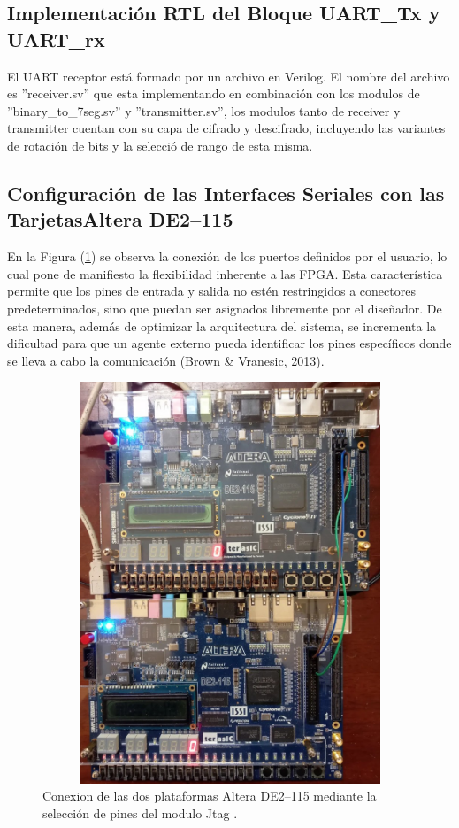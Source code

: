\subsection{Implementación RTL del Bloque UART\_Tx y UART\_rx }
El UART receptor está formado por un archivo en Verilog. El nombre del archivo es ''receiver.sv'' que esta implementando en combinación con los modulos de ''binary\_to\_7seg.sv'' y ''transmitter.sv'', los modulos tanto de receiver y transmitter cuentan con su capa de cifrado y descifrado, incluyendo las variantes de rotación de bits y la selecció de rango de esta misma.

\subsection{Configuración de las Interfaces Seriales con las TarjetasAltera DE2–115 }

En la Figura (\ref{fig:imagen13}) se observa la conexión de los puertos definidos por el usuario, lo cual pone de manifiesto la flexibilidad inherente a las FPGA. Esta característica permite que los pines de entrada y salida no estén restringidos a conectores predeterminados, sino que puedan ser asignados libremente por el diseñador. De esta manera, además de optimizar la arquitectura del sistema, se incrementa la dificultad para que un agente externo pueda identificar los pines específicos donde se lleva a cabo la comunicación (Brown \& Vranesic, 2013).

\begin{figure}[h!] %
    \centering %
     \includegraphics[width=1\textwidth, height=12cm]{imagenes/img13} %
    \caption{  Conexion de las dos plataformas Altera DE2–115 mediante la selección de pines del modulo Jtag .}
    \label{fig:imagen13} %
\end{figure} 

